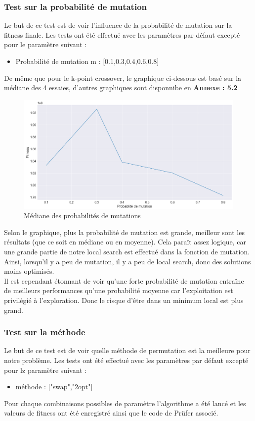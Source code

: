 \documentclass{article} %
\begin{document}
\subsubsection{Test sur la probabilité de mutation}
Le but de ce test est de voir l'influence de la probabilité de mutation sur la fitness finale. Les tests ont été effectué avec les paramètres par défaut excepté pour le paramètre suivant :
\begin{itemize}
	\item Probabilité de mutation m : [0.1,0.3,0.4,0.6,0.8]
\end{itemize}
De même que pour le k-point crossover, le graphique ci-dessous est basé sur la médiane des 4 essaies, d'autres graphiques sont disponnibe en \textbf{Annexe : 5.2}
\begin{figure}[!h]
	\centering
	\includegraphics[keepaspectratio = true,scale=0.65]{mutationProb.png}
	\caption{Médiane des probabilités de mutations}
\end{figure}
Selon le graphique, plus la probabilité de mutation est grande, meilleur sont les résultats (que ce soit en médiane ou en moyenne). Cela paraît assez logique, car une grande partie de notre local search est effectué dans la fonction de mutation. Ainsi, lorsqu'il y a peu de mutation, il y a peu de local search, donc des solutions moins optimisés.\\
Il est cependant étonnant de voir qu'une forte probabilité de mutation entraîne de meilleurs performances qu'une probabilité moyenne car l'exploitation est privilégié à l'exploration. Donc le risque d'être dans un minimum local est plus grand.\\
\newpage
\subsubsection{Test sur la méthode}
Le but de ce test est de voir quelle méthode de permutation est la meilleure pour notre problème. Les tests ont été effectué avec les paramètres par défaut excepté pour lz paramètre suivant :
\begin{itemize}
	\item méthode : ["swap","2opt"]
\end{itemize}
Pour chaque combinaisons possibles de paramètre l'algorithme a été lancé et les valeurs de fitness ont été enregistré ainsi que le code de Prüfer associé.
\end{document}
